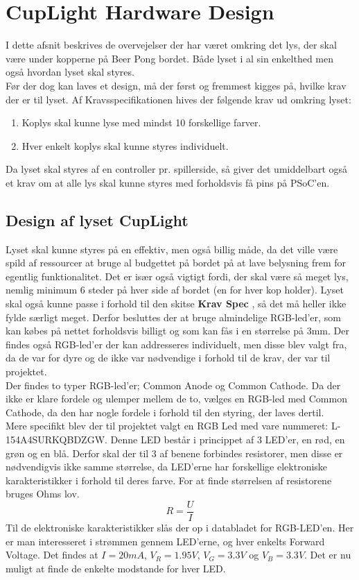 \documentclass[HardwareDesign/HardwareDesign_main.tex]{subfiles}
\begin{document}
\section{CupLight Hardware Design}\label{sec:cuplight_hw_design}
I dette afsnit beskrives de overvejelser der har været omkring det lys, der skal være under kopperne på Beer Pong bordet. Både lyset i al sin enkelthed men også hvordan lyset skal styres.\\
Før der dog kan laves et design, må der først og fremmest kigges på, hvilke krav der er til lyset. Af Kravsspecifikationen  hives der følgende krav ud omkring lyset:
\begin{enumerate}
    \item Koplys skal kunne lyse med mindst 10 forskellige farver.
    \item Hver enkelt koplys skal kunne styres individuelt.
\end{enumerate}
Da lyset skal styres af en controller pr. spillerside, så giver det umiddelbart også et krav om at alle lys skal kunne styres med forholdsvis få pins på PSoC'en. 
\subsection{Design af lyset CupLight}
Lyset skal kunne styres på en effektiv, men også billig måde, da det ville være spild af ressourcer at bruge al budgettet på bordet på at lave belysning frem for egentlig funktionalitet. Det er især også vigtigt fordi, der skal være så meget lys, nemlig minimum 6 steder på hver side af bordet (en for hver kop holder). Lyset skal også kunne passe i forhold til den skitse \textbf{Krav Spec} , så det må heller ikke fylde særligt meget. Derfor besluttes der at bruge almindelige RGB-led'er, som kan købes på nettet forholdsvis billigt og som kan fås i en størrelse på 3mm. Der findes også RGB-led'er der kan addresseres individuelt, men disse blev valgt fra, da de var for dyre og de ikke var nødvendige i forhold til de krav, der var til projektet. 
\\Der findes to typer RGB-led'er; Common Anode og Common Cathode. Da der ikke er klare fordele og ulemper mellem de to, vælges en RGB-led med Common Cathode, da den har nogle fordele i forhold til den styring, der laves dertil. 
\\Mere specifikt blev der til projektet valgt en RGB Led med vare nummeret: \textsc{L-154A4SURKQBDZGW}\cite{RGBledDatasheet}. Denne LED består i princippet af 3 LED'er, en rød, en grøn og en blå. Derfor skal der til 3 af benene forbindes resistorer, men disse er nødvendigvis ikke samme størrelse, da LED'erne har forskellige elektroniske karakteristikker i forhold til deres farve. For at finde størrelsen af resistorene bruges Ohms lov.
\begin{equation}
    R=\frac{U}{I}
\end{equation}
Til de elektroniske karakteristikker slås der op i databladet for RGB-LED'en. Her er man interesseret i strømmen gennem LED'erne, og hver enkelts Forward Voltage. Det findes at $I=20mA$, $V_R=1.95V$, $V_G=3.3V$ og $V_B=3.3V$. Det er nu muligt at finde de enkelte modstande for hver LED.
\end{document}
